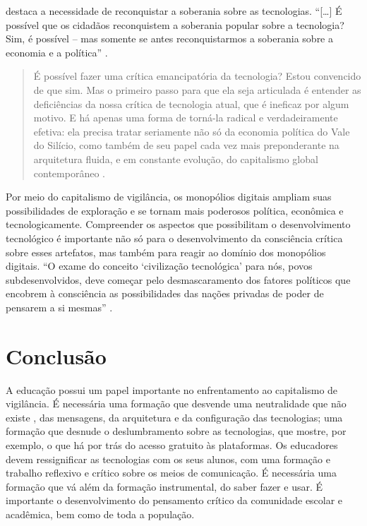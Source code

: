 \documentclass[portuguese]{textolivre}
\begin{document}
\textcite{morozov2018} destaca a necessidade de reconquistar a soberania sobre as tecnologias. “[…] É possível que os cidadãos reconquistem a soberania popular sobre a tecnologia? Sim, é possível – mas somente se antes reconquistarmos a soberania sobre a economia e a política” \cite[p. 25]{morozov2018}.

\begin{quote}
 É possível fazer uma crítica emancipatória da tecnologia? Estou convencido de que sim. Mas o primeiro passo para que ela seja articulada é entender as deficiências da nossa crítica de tecnologia atual, que é ineficaz por algum motivo. E há apenas uma forma de torná-la radical e verdadeiramente efetiva: ela precisa tratar seriamente não só da economia política do Vale do Silício, como também de seu papel cada vez mais preponderante na arquitetura fluida, e em constante evolução, do capitalismo global contemporâneo \cite[p. 26]{morozov2018}.
\end{quote}

Por meio do capitalismo de vigilância, os monopólios digitais ampliam suas possibilidades de exploração e se tornam mais poderosos política, econômica e tecnologicamente. Compreender os aspectos que possibilitam o desenvolvimento tecnológico é importante não só para o desenvolvimento da consciência crítica sobre esses artefatos, mas também para reagir ao domínio dos monopólios digitais. “O exame do conceito ‘civilização tecnológica’ para nós, povos subdesenvolvidos, deve começar pelo desmascaramento dos fatores políticos que encobrem à consciência as possibilidades das nações privadas de poder de pensarem a si mesmas” \cite[p. 46]{pinto_o_2005}.


\section{Conclusão}

A educação possui um papel importante no enfrentamento ao capitalismo de vigilância. É necessária uma formação que desvende uma neutralidade que não existe \cite{freire_educar_2011}, das mensagens, da arquitetura e da configuração das tecnologias; uma formação que desnude o deslumbramento sobre as tecnologias, que mostre, por exemplo, o que há por trás do acesso gratuito às plataformas. Os educadores devem ressignificar as tecnologias com os seus alunos, com uma formação e trabalho reflexivo e crítico sobre os meios de comunicação. É necessária uma formação que vá além da formação instrumental, do saber fazer e usar. É importante o desenvolvimento do pensamento crítico da comunidade escolar e acadêmica, bem como de toda a população.
\end{document}
